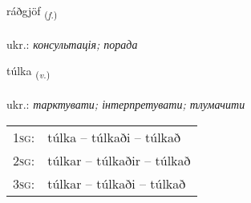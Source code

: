 \documentclass[frontgrid, backgrid]{flacards}\usepackage[]{graphicx}\usepackage[]{xcolor}
\begin{document}
\renewcommand{\flhead}{\vskip5pt \fboxsep=0pt {\small\bfseries\footnotesize Nafnorð | іменник}}
\renewcommand{\fcfoot}{\vskip5pt \fboxsep=0pt \hspace{2pt}{\small\bfseries\footnotesize 2K}}

\renewcommand{\blhead}{\vskip5pt {\small\bfseries\footnotesize Nafnorð | іменник }}
\renewcommand{\bcfoot}{\vskip5pt \hspace{2pt}{\small\bfseries\footnotesize 2K}}


{ráðgjöf \small{\textsubscript{(\textit{f.})}} \\[1ex] %
\textphonetic{[rauðcœv]} \\
ukr.: \emph{консультація; порада} \\  [2ex]
\renewcommand*{\arraystretch}{0.8}
}

\renewcommand{\flhead}{\vskip5pt \fboxsep=0pt {\small\bfseries\footnotesize Sagnorð | дієслово}}
\renewcommand{\fcfoot}{\vskip5pt \fboxsep=0pt \hspace{2pt}{\small\bfseries\footnotesize 2K}}

\renewcommand{\blhead}{\vskip5pt {\small\bfseries\footnotesize Sagnorð | дієслово }}
\renewcommand{\bcfoot}{\vskip5pt \hspace{2pt}{\small\bfseries\footnotesize 2K}}


{túlka \small{\textsubscript{(\textit{v.})}} \\[1ex] %
\textphonetic{[tʰul̥ka]} \\
ukr.: \emph{тарктувати; інтерпретувати; тлумачити} \\  [2ex]
\renewcommand*{\arraystretch}{0.8}
\begin{tabular}{p{1cm}l}
\textsc{1sg}: & túlka -- túlkaði -- túlkað \\ 
\textsc{2sg}: & túlkar -- túlkaðir -- túlkað \\ 
\textsc{3sg}: & túlkar -- túlkaði -- túlkað \\ 
\end{tabular}
}
\end{document}
